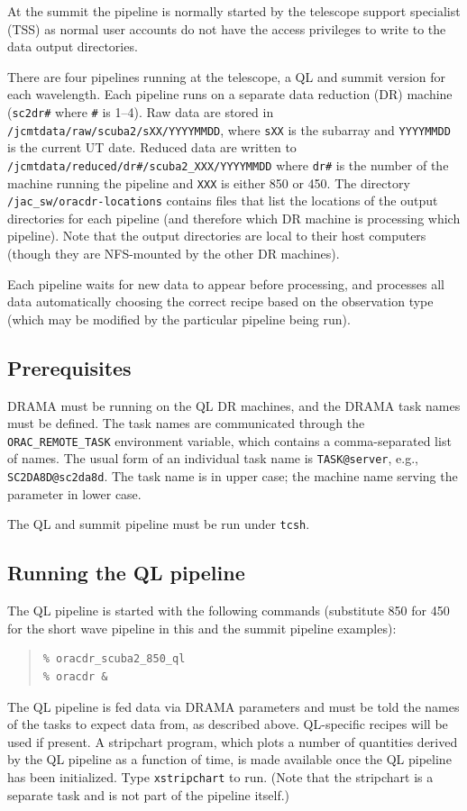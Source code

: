 \documentclass[twoside,11pt]{article}
\renewcommand{\_}{\texttt{\symbol{95}}}
\newenvironment{myquote}{\begin{quote}\begin{small}}{\end{small}\end{quote}}
\begin{document}
At the summit the pipeline is normally started by the telescope
support specialist (TSS) as normal user accounts do not have the
access privileges to write to the data output directories.

There are four pipelines running at the telescope, a QL and summit
version for each wavelength. Each pipeline runs on a separate data
reduction (DR) machine (\verb+sc2dr#+ where \verb+#+ is 1--4). Raw
data are stored in \verb+/jcmtdata/raw/scuba2/sXX/YYYYMMDD+, where
\verb+sXX+ is the subarray and \verb+YYYYMMDD+ is the current UT
date. Reduced data are written
to\\ \verb+/jcmtdata/reduced/dr#/scuba2_XXX/YYYYMMDD+ where \verb+dr#+
is the number of the machine running the pipeline and \verb+XXX+ is
either 850 or 450. The directory \verb+/jac_sw/oracdr-locations+
contains files that list the locations of the output directories for
each pipeline (and therefore which DR machine is processing which
pipeline). Note that the output directories are local to their host
computers (though they are NFS-mounted by the other DR machines).

Each pipeline waits for new data to appear before processing, and
processes all data automatically choosing the correct recipe based on
the observation type (which may be modified by the particular pipeline
being run).

\subsection{Prerequisites}

DRAMA must be running on the QL DR machines, and the DRAMA task names
must be defined. The task names are communicated through the
\verb+ORAC_REMOTE_TASK+ environment variable, which contains a
comma-separated list of names. The usual form of an individual task
name is \verb+TASK@server+, e.g., \verb+SC2DA8D@sc2da8d+. The task
name is in upper case; the machine name serving the parameter in lower
case.

The QL and summit pipeline must be run under \verb+tcsh+.

\subsection{Running the QL pipeline}

The QL pipeline is started with the following commands (substitute 850
for 450 for the short wave pipeline in this and the summit pipeline
examples):
\begin{myquote}
\begin{verbatim}
% oracdr_scuba2_850_ql
% oracdr &
\end{verbatim}
\end{myquote}
The QL pipeline is fed data via DRAMA parameters and must be told the
names of the tasks to expect data from, as described
above. QL-specific recipes will be used if present. A stripchart
program, which plots a number of quantities derived by the QL pipeline
as a function of time, is made available once the QL pipeline has been
initialized. Type \verb+xstripchart+ to run. (Note that the stripchart
is a separate task and is not part of the pipeline itself.)
\end{document}
